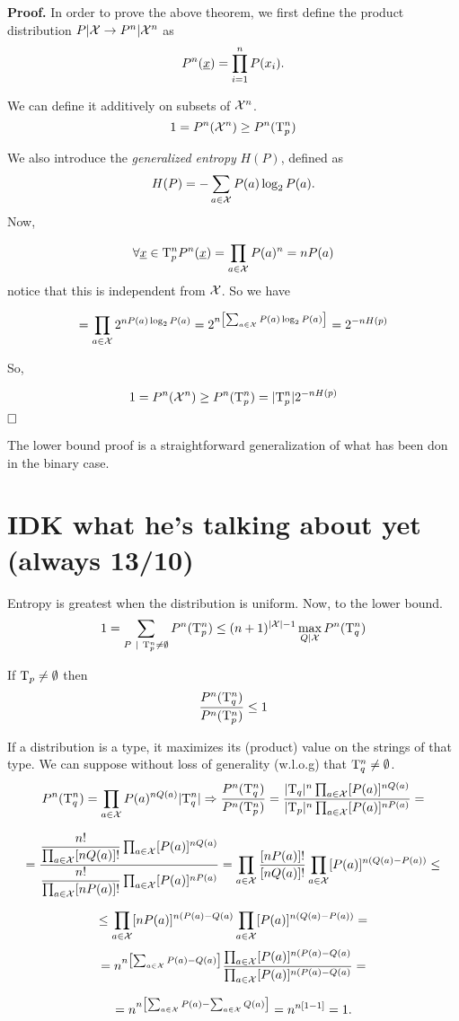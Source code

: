 \noindent\textbf{Proof.} In order to prove the above theorem, we first define the product distribution $P|\mathcal{X} \rightarrow P^n|\mathcal{X}^n$ as 
\begin{equation}
	P^n(\underline{x}) = \prod_{i = 1}^nP(x_i).
\end{equation}

We can define it additively on subsets of $\mathcal{X}^n$.
\[
1 = P^n(\mathcal{X}^n) \geq P^n(\mathrm{T}_p^n)
\]

We also introduce the \emph{generalized entropy} $H(P)$, defined as $$H(P) = -\sum_{a \in \mathcal{X}} P(a)\log_2P(a).$$
Now,

\[
\forall \underline{x} \in \mathrm{T}_p^n P^n(\underline{x}) = \prod_{a \in \mathcal{X}}P(a)^n = nP(a)
\]
notice that this is independent from $\mathcal{X}$. So we have

\[ 
= \prod_{a \in \mathcal{X}} 2^{nP(a)\log_2P(a)} = 2^{n\left[\sum_{a \in \mathcal{X}} P(a)\log_2P(a)\right]} = 2^{-nH(p)}
\]

So,

\[1 = P^n(\mathcal{X}^n) \geq P^n(\mathrm{T}^n_p) = |\mathrm{T}_p^n|2^{-nH(p)} \] $\hfill\Box$

The lower bound proof is a straightforward generalization of what has been don in the binary case.

\section{IDK what he's talking about yet (always 13/10)}
Entropy is greatest when the distribution is uniform. Now, to the lower bound.
\[
1 = \sum_{P\ |\ \mathrm{T}_p^n \not= \emptyset}P^n(\mathrm{T}_p^n) \leq (n+1)^{|\mathcal{X}|-1} \max_{Q|\mathcal{X}}P^n(\mathrm{T}_q^n)
\]

\begin{obs}
If $\mathrm{T}_p \not= \emptyset$ then $$\dfrac{P^n(\mathrm{T}^n_q)}{P^n(\mathrm{T}^n_p)} \leq 1$$
\end{obs}

If a distribution is a type, it maximizes its (product) value on the strings of that type. We can suppose without loss of generality (w.l.o.g) that $\mathrm{T}^n_q \not= \emptyset$.
\[
P^n(\mathrm{T}_q^n) = \prod_{a \in \mathcal{X}} P(a)^{nQ(a)}|\mathrm{T}_q^n| \Rightarrow \dfrac{P^n(\mathrm{T}_q^n)}{P^n(\mathrm{T}_p^n)} = \dfrac{|\mathrm{T}_q|^n\prod_{a \in \mathcal{X}}[P(a)]^{nQ(a)}}{|\mathrm{T}_p|^n\prod_{a \in \mathcal{X}}[P(a)]^{nP(a)}} =
\]

\[
 = \dfrac{\dfrac{n!}{\prod_{a\in\mathcal{X}}[nQ(a)]!}\prod_{a\in\mathcal{X}}[P(a)]^{nQ(a)}}
 {\dfrac{n!}{\prod_{a\in\mathcal{X}}[nP(a)]!}\prod_{a\in\mathcal{X}}[P(a)]^{nP(a)}} = \prod_{a \in\mathcal{X}} \dfrac{[nP(a)]!}{[nQ(a)]!}\prod_{a\in\mathcal{X}}[P(a)]^{n(Q(a)-P(a))}\leq 
\]

\[
\leq \prod_{a \in \mathcal{X}} [nP(a)]^{n(P(a)-Q(a)}\prod_{a\in\mathcal{X}}[P(a)]^{n(Q(a)-P(a))} =
\]
\[
 = n^{n\left[\sum_{a \in \mathcal{X}}P(a) - Q(a)\right ]} \dfrac{\prod_{a \in \mathcal{X}}[P(a)]^{n(P(a)-Q(a)}}{\prod_{a \in \mathcal{X}}[P(a)]^{n(P(a)-Q(a)}} =
\]

\[ 
= n^{n\left [\sum_{a \in\mathcal{X}}P(a) -\sum_{a \in\mathcal{X}}Q(a) \right]} = n^{n[1-1]} = 1.
\]


